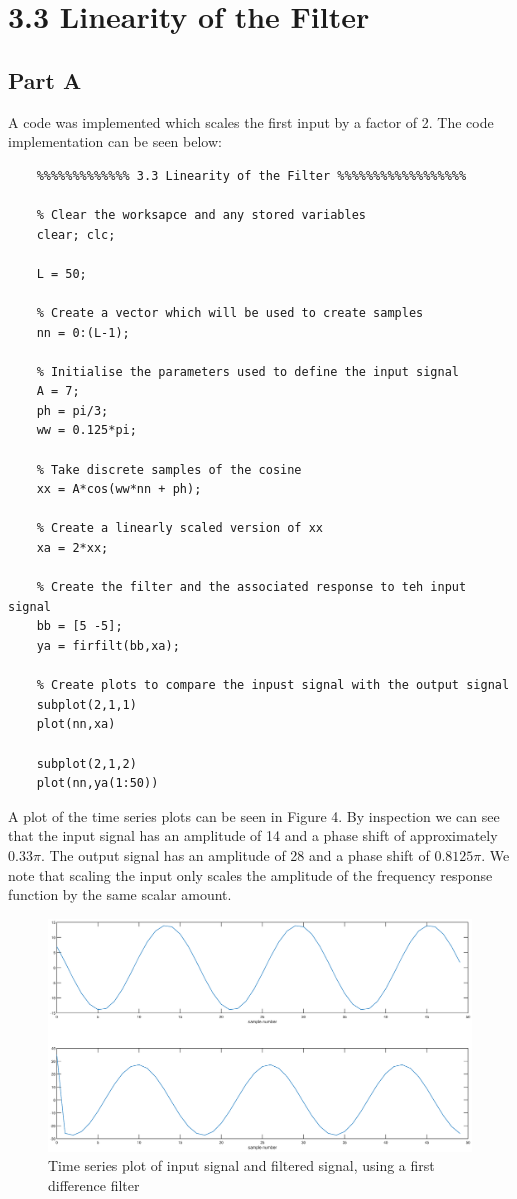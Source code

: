 \documentclass{article}
\begin{document}
\section{3.3 Linearity of the Filter}

\subsection{Part A}

A code was implemented which scales the first input by a factor of 2. The code implementation can be seen below:
\begin{lstlisting}
	%%%%%%%%%%%%% 3.3 Linearity of the Filter %%%%%%%%%%%%%%%%%%
	
	% Clear the worksapce and any stored variables
	clear; clc;
	
	L = 50;
	
	% Create a vector which will be used to create samples
	nn = 0:(L-1);
	
	% Initialise the parameters used to define the input signal
	A = 7;
	ph = pi/3;
	ww = 0.125*pi;
	
	% Take discrete samples of the cosine
	xx = A*cos(ww*nn + ph);
	
	% Create a linearly scaled version of xx
	xa = 2*xx;
	
	% Create the filter and the associated response to teh input signal
	bb = [5 -5];
	ya = firfilt(bb,xa);
	
	% Create plots to compare the inpust signal with the output signal
	subplot(2,1,1)
	plot(nn,xa)
	
	subplot(2,1,2)
	plot(nn,ya(1:50))
\end{lstlisting}

A plot of the time series plots can be seen in Figure 4. By inspection we can see that the input signal has an amplitude of 14 and a phase shift of approximately $0.33 \pi$. The output signal has an amplitude of 28 and a phase shift of $0.8125 \pi$. We note that scaling the input only scales the amplitude of the frequency response function by the same scalar amount.

\begin{figure}[H]
	\centering
	\includegraphics[scale=0.3]{fig4}
	\caption{Time series plot of input signal and filtered signal, using a first difference filter}
\end{figure}
\end{document}

